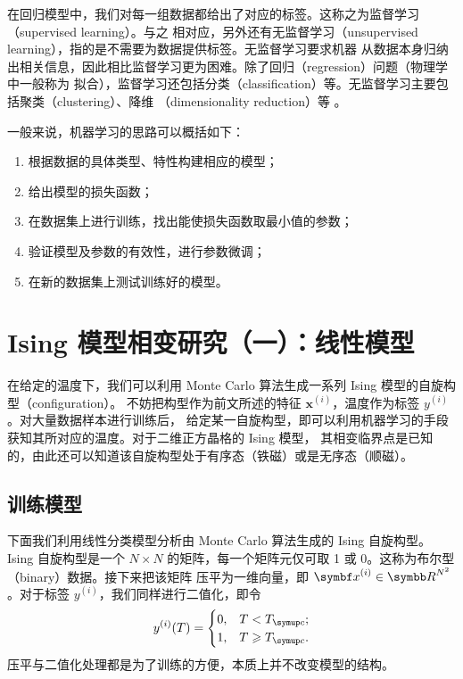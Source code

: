 在回归模型中，我们对每一组数据都给出了对应的标签。这称之为监督学习（supervised learning）。与之
相对应，另外还有无监督学习（unsupervised learning），指的是不需要为数据提供标签。无监督学习要求机器
从数据本身归纳出相关信息，因此相比监督学习更为困难。除了回归（regression）问题（物理学中一般称为
拟合），监督学习还包括分类（classification）等。无监督学习主要包括聚类（clustering）、降维
（dimensionality reduction）等 \cite{zhouzhihua,wiki:ml}。

一般来说，机器学习的思路可以概括如下：

\begin{enumerate}
  \item 根据数据的具体类型、特性构建相应的模型；
  \item 给出模型的损失函数；
  \item 在数据集上进行训练，找出能使损失函数取最小值的参数；
  \item 验证模型及参数的有效性，进行参数微调；
  \item 在新的数据集上测试训练好的模型。
\end{enumerate}

\section{Ising 模型相变研究（一）：线性模型}

在给定的温度下，我们可以利用 Monte Carlo 算法生成一系列 Ising 模型的自旋构型（configuration）。
不妨把构型作为前文所述的特征 $\bm{x}^{(i)}$，温度作为标签 $y^{(i)}$。对大量数据样本进行训练后，
给定某一自旋构型，即可以利用机器学习的手段获知其所对应的温度。对于二维正方晶格的 Ising 模型，
其相变临界点是已知的，由此还可以知道该自旋构型处于有序态（铁磁）或是无序态（顺磁）。

\subsection{训练模型}

下面我们利用线性分类模型分析由 Monte Carlo 算法生成的 Ising 自旋构型。Ising 自旋构型是一个
$N\times N$ 的矩阵，每一个矩阵元仅可取 1 或 0。这称为布尔型（binary）数据。接下来把该矩阵
压平为一维向量，即 $\bm{x}^{(i)}\in\R^{N^2}$。对于标签 $y^{(i)}$，我们同样进行二值化，即令
\begin{equation}
  y^{(i)}(T) =
  \begin{cases}
    0, & T <         \Tc; \\
    1, & T \geqslant \Tc.
  \end{cases}
\end{equation}
压平与二值化处理都是为了训练的方便，本质上并不改变模型的结构。

